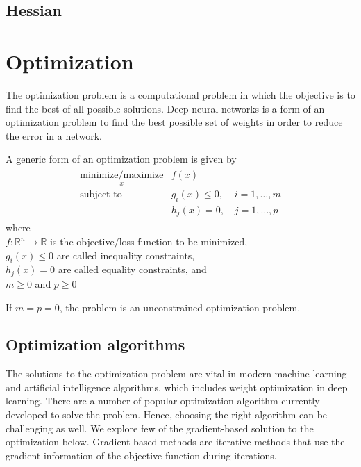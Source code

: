 \subsection{Hessian}
\section{Optimization}
The optimization problem is a computational problem in which the objective is to find the best of all possible solutions. Deep neural networks is a form of an optimization problem to find the best possible set of weights in order to reduce the error in a network.

\noindent A generic form of an optimization problem is given by 
\begin{align}
  \begin{matrix}
    \nonumber
    \underset{x}{\text{minimize/maximize}} &f(x) & \\
    \text{subject to} &g_i(x) \leq 0, \, \, & i=1,\dots,m \\
    &h_j(x) = 0, & j=1,\dots,p
  \end{matrix}
\end{align} 
\noindent where \\
\indent $f: \mathbb{R}^n \rightarrow \mathbb{R}$ is the objective/loss function to be minimized,\\
\indent $g_i(x) \leq 0$ are called inequality constraints,\\
\indent $h_j(x) = 0$ are called equality constraints, and \\
\indent $m\geq0$ and $p\geq0$

\vspace{5mm}
\noindent If $m=p=0$, the problem is an unconstrained optimization problem.
\subsection{Optimization algorithms}
The solutions to the optimization problem are vital in modern machine learning and artificial intelligence algorithms, which includes weight optimization in deep learning. There are a number of popular optimization algorithm currently developed to solve the problem. Hence, choosing the right algorithm can be challenging as well.
\vspace{5mm}
\noindent We explore few of the gradient-based solution to the optimization below. Gradient-based methods are iterative methods that use the gradient information of the objective function during iterations.

